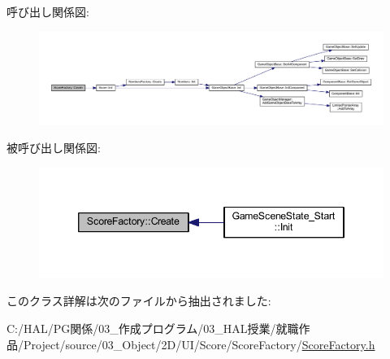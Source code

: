 呼び出し関係図\+:\nopagebreak
\begin{figure}[H]
\begin{center}
\leavevmode
\includegraphics[width=350pt]{class_score_factory_a1c3047d657151d5bbda8157a743b154d_cgraph}
\end{center}
\end{figure}
被呼び出し関係図\+:\nopagebreak
\begin{figure}[H]
\begin{center}
\leavevmode
\includegraphics[width=346pt]{class_score_factory_a1c3047d657151d5bbda8157a743b154d_icgraph}
\end{center}
\end{figure}


このクラス詳解は次のファイルから抽出されました\+:\begin{DoxyCompactItemize}
\item 
C\+:/\+H\+A\+L/\+P\+G関係/03\+\_\+作成プログラム/03\+\_\+\+H\+A\+L授業/就職作品/\+Project/source/03\+\_\+\+Object/2\+D/\+U\+I/\+Score/\+Score\+Factory/\mbox{\hyperlink{_score_factory_8h}{Score\+Factory.\+h}}\end{DoxyCompactItemize}
